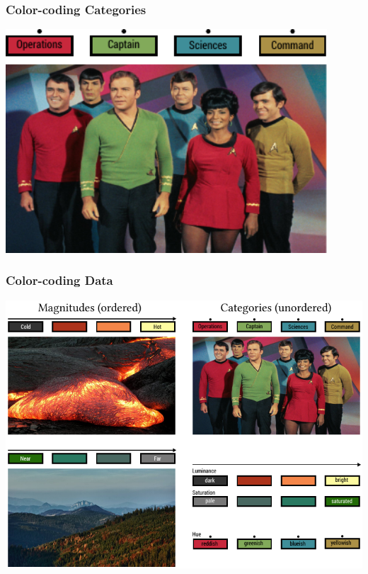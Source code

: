 \documentclass[hyperref={bookmarks=false}]{beamer}
\begin{document}

\begin{frame}
\frametitle{Color-coding Categories}

\center\includegraphics[width = 0.9\textwidth]{./fig/color_coded_hue.pdf}


\end{frame}


\begin{frame}
\frametitle{Color-coding Data}

\center\includegraphics[width = \textwidth]{./fig/color_coded_complete.pdf}

\end{frame}
\end{document}
